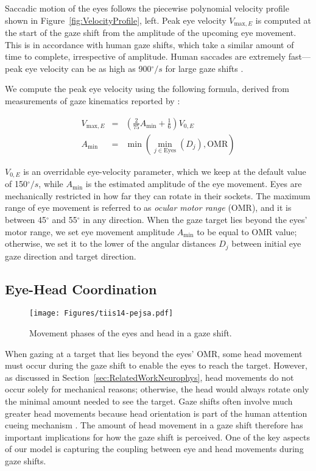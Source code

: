 Saccadic motion of the eyes follows the piecewise polynomial velocity profile shown in Figure~\ref{fig:VelocityProfile}, left. Peak eye velocity $V_{\mathrm{max},E}$ is computed at the start of the gaze shift from the amplitude of the upcoming eye movement. This is in accordance with human gaze shifts, which take a similar amount of time to complete, irrespective of amplitude. Human saccades are extremely fast---peak eye velocity can be as high as 900$^{\circ}/s$ for large gaze shifts \cite{bahill1975main}.

We compute the peak eye velocity using the following formula, derived from measurements of gaze kinematics reported by \citet{guitton1987gaze}:

\begin{eqnarray} \label{eq:AndristVmaxE}
V_{\mathrm{max},E} &=& (\frac{2}{75} A_{\mathrm{min}} + \frac{1}{6}) V_{0,E} \\
A_{\mathrm{min}} &=& \mathop{min}( \mathop{min}_{j \in \mathrm{Eyes}}(D_j), \mathrm{OMR} ) \nonumber
\end{eqnarray}

$V_{0,E}$ is an overridable eye-velocity parameter, which we keep at the default value of 150$^{\circ}/s$, while $A_{\mathrm{min}}$ is the estimated amplitude of the eye movement. Eyes are mechanically restricted in how far they can rotate in their sockets. The maximum range of eye movement is referred to as \emph{ocular motor range} (OMR), and it is between 45$^{\circ}$ and 55$^{\circ}$ in any direction. When the gaze target lies beyond the eyes' motor range, we set eye movement amplitude $A_{\mathrm{min}}$ to be equal to OMR value; otherwise, we set it to the lower of the angular distances $D_j$ between initial eye gaze direction and target direction.

\subsection{Eye-Head Coordination}

\begin{figure*}[b]
\centering
\texttt{[image: Figures/tiis14-pejsa.pdf]}
\caption{Movement phases of the eyes and head in a gaze shift.}
\label{fig:AndristGazeModel}
\end{figure*}

When gazing at a target that lies beyond the eyes' OMR, some head movement must occur during the gaze shift to enable the eyes to reach the target. However, as discussed in Section~\ref{sec:RelatedWorkNeurophys}, head movements do not occur solely for mechanical reasons; otherwise, the head would always rotate only the minimal amount needed to see the target. Gaze shifts often involve much greater head movements because head orientation is part of the human attention cueing mechanism \cite{hietanen1999does}. The amount of head movement in a gaze shift therefore has important implications for how the gaze shift is perceived. One of the key aspects of our model is capturing the coupling between eye and head movements during gaze shifts.

